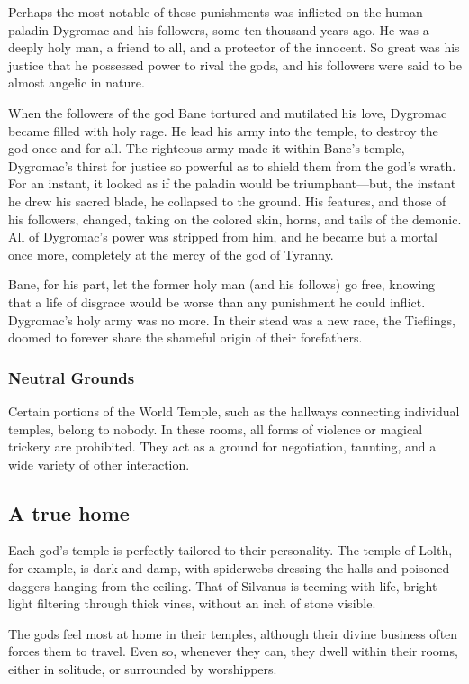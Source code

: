\begin{multicols}{2}
Perhaps the most notable of these punishments was inflicted on the human paladin Dygromac and his followers, some ten thousand years ago.
He was a deeply holy man, a friend to all, and a protector of the innocent.
So great was his justice that he possessed power to rival the gods, and his followers were said to be almost angelic in nature.

When the followers of the god Bane tortured and mutilated his love, Dygromac became filled with holy rage.
He lead his army into the temple, to destroy the god once and for all.
The righteous army made it within Bane's temple, Dygromac's thirst for justice so powerful as to shield them from the god's wrath.
For an instant, it looked as if the paladin would be triumphant---but, the instant he drew his sacred blade, he collapsed to the ground.
His features, and those of his followers, changed, taking on the colored skin, horns, and tails of the demonic.
All of Dygromac's power was stripped from him, and he became but a mortal once more, completely at the mercy of the god of Tyranny.

Bane, for his part, let the former holy man (and his follows) go free, knowing that a life of disgrace would be worse than any punishment he could inflict.
Dygromac's holy army was no more.
In their stead was a new race, the Tieflings, doomed to forever share the shameful origin of their forefathers.

\subsubsection{Neutral Grounds}
Certain portions of the World Temple, such as the hallways connecting individual temples, belong to nobody.
In these rooms, all forms of violence or magical trickery are prohibited.
They act as a ground for negotiation, taunting, and a wide variety of other interaction. 

\subsection{A true home}
Each god's temple is perfectly tailored to their personality.
The temple of Lolth, for example, is dark and damp, with spiderwebs dressing the halls and poisoned daggers hanging from the ceiling.
That of Silvanus is teeming with life, bright light filtering through thick vines, without an inch of stone visible.

The gods feel most at home in their temples, although their divine business often forces them to travel.
Even so, whenever they can, they dwell within their rooms, either in solitude, or surrounded by worshippers.


\end{multicols}
